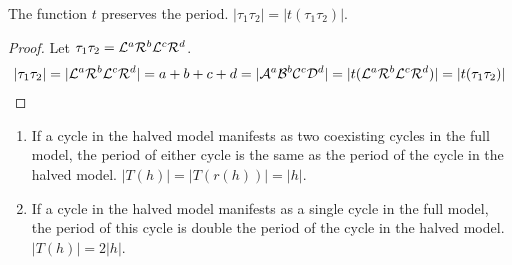 \begin{lemma}
	\label{lemma:t.preserves.period}
	The function $t$ preserves the period. $|\tau_1\tau_2| = |t(\tau_1\tau_2)|$.
\end{lemma}

\begin{proof}
	Let $\tau_1\tau_2 = \mathcal{L}^a\mathcal{R}^b\mathcal{L}^c\mathcal{R}^d$.
	\begin{align*}
		|\tau_1\tau_2| =  |\mathcal{L}^a\mathcal{R}^b\mathcal{L}^c\mathcal{R}^d|
		= a + b + c + d
		= |\mathcal{A}^a\mathcal{B}^b\mathcal{C}^c\mathcal{D}^d|
		= |t(\mathcal{L}^a\mathcal{R}^b\mathcal{L}^c\mathcal{R}^d)|
		= |t(\tau_1\tau_2)|
	\end{align*}
\end{proof}

\begin{theorem}
	\begin{enumerate}
		\item If a cycle in the halved model manifests as two coexisting cycles in the full model, the period of either cycle is the same as the period of the cycle in the halved model. $|T(h)| = |T(r(h))| = |h|$.
		\item If a cycle in the halved model manifests as a single cycle in the full model, the period of this cycle is double the period of the cycle in the halved model. $|T(h)| = 2 |h|$.
	\end{enumerate}
\end{theorem}

